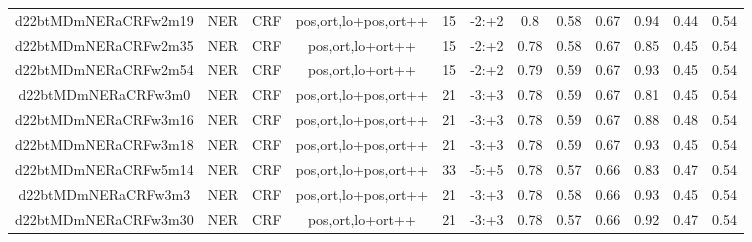 \documentclass[a4paper]{article}
\begin{document}
\begin{landscape}
\begin{center}
\begin{tabular}{ |c|c|c|c|c|c|c|c|c|c|c|c|}
 
 	
 	\small{ d22btMDmNERaCRFw2m19 } & \small{ NER} & \small{  CRF }  & pos,ort,lo+pos,ort++  &  15 &  \small{  -2:+2 }  &  0.8 & 0.58 & 0.67  &  0.94 & 0.44 & 0.54 \\
 	

 
 	
 	\small{ d22btMDmNERaCRFw2m35 } & \small{ NER} & \small{  CRF }  & pos,ort,lo+ort++  &  15 &  \small{  -2:+2 }  &  0.78 & 0.58 & 0.67  &  0.85 & 0.45 & 0.54 \\
 	

 
 	
 	\small{ d22btMDmNERaCRFw2m54 } & \small{ NER} & \small{  CRF }  & pos,ort,lo+ort++  &  15 &  \small{  -2:+2 }  &  0.79 & 0.59 & 0.67  &  0.93 & 0.45 & 0.54 \\
 	

 
 	
 	\small{ d22btMDmNERaCRFw3m0 } & \small{ NER} & \small{  CRF }  & pos,ort,lo+pos,ort++  &  21 &  \small{  -3:+3 }  &  0.78 & 0.59 & 0.67  &  0.81 & 0.45 & 0.54 \\
 	

 
 	
 	\small{ d22btMDmNERaCRFw3m16 } & \small{ NER} & \small{  CRF }  & pos,ort,lo+pos,ort++  &  21 &  \small{  -3:+3 }  &  0.78 & 0.59 & 0.67  &  0.88 & 0.48 & 0.54 \\
 	

 
 	
 	\small{ d22btMDmNERaCRFw3m18 } & \small{ NER} & \small{  CRF }  & pos,ort,lo+pos,ort++  &  21 &  \small{  -3:+3 }  &  0.78 & 0.59 & 0.67  &  0.93 & 0.45 & 0.54 \\
 	

 
 	
 	\small{ d22btMDmNERaCRFw5m14 } & \small{ NER} & \small{  CRF }  & pos,ort,lo+pos,ort++  &  33 &  \small{  -5:+5 }  &  0.78 & 0.57 & 0.66  &  0.83 & 0.47 & 0.54 \\
 	

 
 	
 	\small{ d22btMDmNERaCRFw3m3 } & \small{ NER} & \small{  CRF }  & pos,ort,lo+pos,ort++  &  21 &  \small{  -3:+3 }  &  0.78 & 0.58 & 0.66  &  0.93 & 0.45 & 0.54 \\
 	

 
 	
 	\small{ d22btMDmNERaCRFw3m30 } & \small{ NER} & \small{  CRF }  & pos,ort,lo+ort++  &  21 &  \small{  -3:+3 }  &  0.78 & 0.57 & 0.66  &  0.92 & 0.47 & 0.54 \\
 	


\end{tabular}
\end{center}
\end{landscape}
\end{document}
